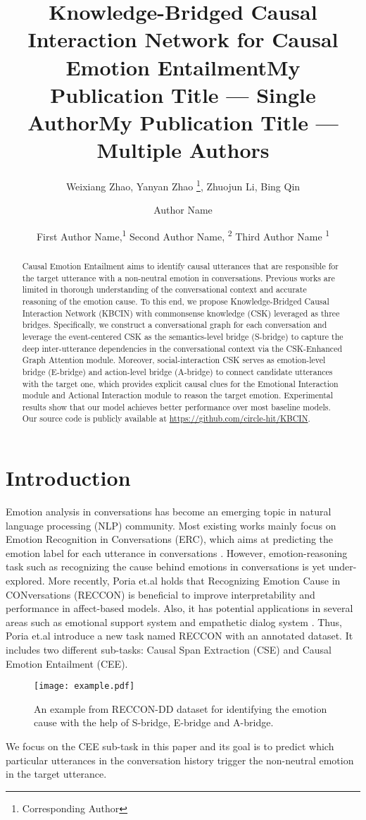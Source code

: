 \documentclass[letterpaper]{article} \usepackage{aaai23}  \usepackage{times}  \usepackage{helvet}  \usepackage{courier}  \usepackage[hyphens]{url}  \usepackage{graphicx} \urlstyle{rm} \def\UrlFont{\rm}  \usepackage{natbib}  \usepackage{caption} \frenchspacing  \setlength{\pdfpagewidth}{8.5in} \setlength{\pdfpageheight}{11in} \usepackage{algorithm}
\title{Knowledge-Bridged Causal Interaction Network for Causal Emotion Entailment}
\author{
Weixiang Zhao,
    Yanyan Zhao \thanks{Corresponding Author},
    Zhuojun Li,
    Bing Qin
}
\title{My Publication Title --- Single Author}
\author {
    Author Name
}
\title{My Publication Title --- Multiple Authors}
\author {
First Author Name,\textsuperscript{\rm 1}
    Second Author Name, \textsuperscript{\rm 2}
    Third Author Name \textsuperscript{\rm 1}
}
\begin{document}
\maketitle

\begin{abstract}
Causal Emotion Entailment aims to identify causal utterances that are responsible for the target utterance with a non-neutral emotion in conversations. Previous works are limited in thorough understanding of the conversational context and accurate reasoning of the emotion cause. To this end, we propose Knowledge-Bridged Causal Interaction Network (KBCIN) with commonsense knowledge (CSK) leveraged as three bridges. Specifically, we construct a conversational graph for each conversation and leverage the event-centered CSK as the semantics-level bridge (S-bridge) to capture the deep inter-utterance dependencies in the conversational context via the CSK-Enhanced Graph Attention module. Moreover, social-interaction CSK serves as emotion-level bridge (E-bridge) and action-level bridge (A-bridge) to connect candidate utterances with the target one, which provides explicit causal clues for the Emotional Interaction module and Actional Interaction module to reason the target emotion. Experimental results show that our model achieves better performance over most baseline models. Our source code is publicly available at \url{https://github.com/circle-hit/KBCIN}.

\end{abstract}

\section{Introduction}
Emotion analysis in conversations has become an emerging topic in natural language processing (NLP) community. Most existing works mainly focus on Emotion Recognition in Conversations (ERC), which aims at predicting the emotion label for each utterance in conversations \cite{dialoguernn,cosmic,dag-erc}. However, emotion-reasoning task such as recognizing the cause behind emotions in conversations is yet under-explored. More recently, Poria et.al  holds that Recognizing Emotion Cause in CONversations (RECCON) is beneficial to improve interpretability and performance in affect-based models. Also, it has potential applications in several areas such as emotional support system \cite{es_peng} and empathetic dialog system \cite{empathy1}. Thus, Poria et.al  introduce a new task named RECCON with an annotated dataset. It includes two different sub-tasks: Causal Span Extraction (CSE) and Causal Emotion Entailment (CEE). 
\begin{figure}[htbp]
\centering
\texttt{[image: example.pdf]}
\caption{An example from RECCON-DD dataset \cite{reccon} for identifying the emotion cause with the help of S-bridge, E-bridge and A-bridge.}
\label{example}
\end{figure}
We focus on the CEE sub-task in this paper and its goal is to predict which particular utterances in the conversation history trigger the non-neutral emotion in the target utterance.
\end{document}
